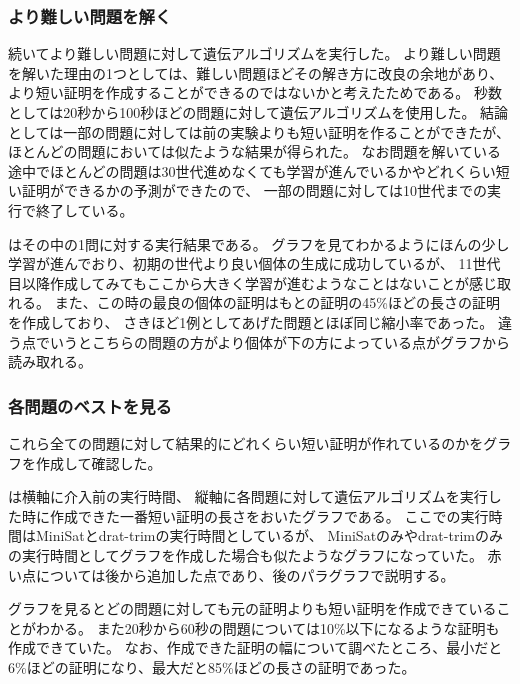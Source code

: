 \subsubsection{より難しい問題を解く}
続いてより難しい問題に対して遺伝アルゴリズムを実行した。
より難しい問題を解いた理由の1つとしては、難しい問題ほどその解き方に改良の余地があり、
より短い証明を作成することができるのではないかと考えたためである。
秒数としては20秒から100秒ほどの問題に対して遺伝アルゴリズムを使用した。
結論としては一部の問題に対しては前の実験よりも短い証明を作ることができたが、ほとんどの問題においては似たような結果が得られた。
なお問題を解いている途中でほとんどの問題は30世代進めなくても学習が進んでいるかやどれくらい短い証明ができるかの予測ができたので、
一部の問題に対しては10世代までの実行で終了している。


はその中の1問に対する実行結果である。
グラフを見てわかるようにほんの少し学習が進んでおり、初期の世代より良い個体の生成に成功しているが、
11世代目以降作成してみてもここから大きく学習が進むようなことはないことが感じ取れる。
また、この時の最良の個体の証明はもとの証明の45\%ほどの長さの証明を作成しており、
さきほど1例としてあげた問題とほぼ同じ縮小率であった。
違う点でいうとこちらの問題の方がより個体が下の方によっている点がグラフから読み取れる。



\subsubsection{各問題のベストを見る}

これら全ての問題に対して結果的にどれくらい短い証明が作れているのかをグラフを作成して確認した。


は横軸に介入前の実行時間、
縦軸に各問題に対して遺伝アルゴリズムを実行した時に作成できた一番短い証明の長さをおいたグラフである。
ここでの実行時間はMiniSatとdrat-trimの実行時間としているが、
MiniSatのみやdrat-trimのみの実行時間としてグラフを作成した場合も似たようなグラフになっていた。
赤い点については後から追加した点であり、後のパラグラフで説明する。

グラフを見るとどの問題に対しても元の証明よりも短い証明を作成できていることがわかる。
また20秒から60秒の問題については10\%以下になるような証明も作成できていた。
なお、作成できた証明の幅について調べたところ、最小だと6\%ほどの証明になり、最大だと85\%ほどの長さの証明であった。

